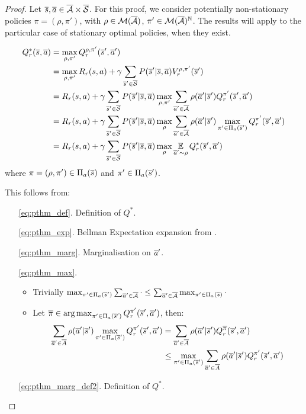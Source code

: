 \subsection{}

\begin{proof}
Let $\overline{s}, \overline{a} \in \overline{\mathcal{A}}\times\overline{\mathcal{S}}$. For this proof, we consider  potentially non-stationary policies $\pi=(\rho, \pi')$, with $\rho\in\mathcal{M}(\overline{\mathcal{A}})$, $\pi'\in\mathcal{M}(\overline{\mathcal{A}})^{\mathbb{N}}$. The results will apply to the particular case of stationary optimal policies, when they exist.

\begin{align}
    Q_r^*(\overline{s}, \overline{a}) &=  \max_{\rho, \pi'} Q_r^{\rho, \pi'}(\overline{s}', \overline{a}') \label{eq:pthm_def}\\
    &= \max_{\rho, \pi'} R_r(s, a) + \gamma \sum_{\overline{s}'\in\overline{\mathcal{S}}} P(\overline{s}' | \overline{s}, \overline{a}) V_r^{\rho, \pi'}(\overline{s}') \label{eq:pthm_exp}\\
    &= R_r(s, a) + \gamma \sum_{\overline{s}'\in\overline{\mathcal{S}}}  P(\overline{s}' | \overline{s}, \overline{a}) \max_{\rho, \pi'} \sum_{\overline{a}'\in\overline{\mathcal{A}}} \rho(\overline{a}' | \overline{s}')Q_r^{\pi'}(\overline{s}', \overline{a}') \label{eq:pthm_marg}\\
    &= R_r(s, a) + \gamma \sum_{\overline{s}'\in\overline{\mathcal{S}}}  P(\overline{s}' | \overline{s}, \overline{a}) \max_\rho\sum_{\overline{a}'\in\overline{\mathcal{A}}}\rho(\overline{a}' | \overline{s}')\max_{\pi'\in\Pi_a(\overline{s}')}Q_r^{\pi'}(\overline{s}', \overline{a}') \label{eq:pthm_max}\\
    &= R_r(s, a) + \gamma \sum_{\overline{s}'\in\overline{\mathcal{S}}}  P(\overline{s}' | \overline{s}, \overline{a}) \max_\rho\operatorname*{\mathbb{E}}\limits_{\overline{a}'\sim\rho}Q_r^*(\overline{s}', \overline{a}') \label{eq:pthm_marg_def2}
\end{align}
where $\pi = (\rho, \pi')\in\Pi_a(\overline{s})$ and $\pi'\in\Pi_a(\overline{s}')$.

This follows from:
\begin{enumerate}
\item[\eqref{eq:pthm_def}.] Definition of $Q^*$. 
\item[\eqref{eq:pthm_exp}.] Bellman Expectation expansion from .
\item[\eqref{eq:pthm_marg}.] Marginalisation on $\overline{a}'$.
\item[\eqref{eq:pthm_max}.] \begin{itemize}
    \item Trivially $\max_{\pi'\in\Pi_a(\overline{s}')} \sum_{\overline{a}'\in\overline{\mathcal{A}}} \cdot \leq \sum_{\overline{a}'\in\overline{\mathcal{A}}} \max_{ \pi'\in\Pi_a(\overline{s})} \cdot$
    \item Let $\overline{\pi}\in\operatorname*{arg\,max}_{\pi'\in\Pi_a(\overline{s}')} Q_r^{\pi'}(\overline{s}', \overline{a}')$, then:
    \begin{align*}
        \sum_{\overline{a}'\in\overline{A}}\rho(\overline{a}'|\overline{s}')\max_{\pi'\in\Pi_a(\overline{s}')}Q_r^{\pi'}(\overline{s}', \overline{a}') &= \sum_{\overline{a}'\in\overline{A}}\rho(\overline{a}'|\overline{s}')Q_r^{\overline{\pi}}(\overline{s}', \overline{a}') \\
        &\leq  \max_{\pi'\in\Pi_a(\overline{s}')} \sum_{\overline{a}'\in\overline{A}}\rho(\overline{a}'|\overline{s}')Q_r^{\pi'}(\overline{s}', \overline{a}')
    \end{align*}
\end{itemize}
\item[\eqref{eq:pthm_marg_def2}.] Definition of $Q^*$.
\end{enumerate}


\end{proof}
